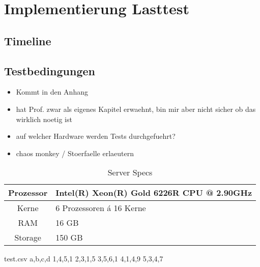 \section{Implementierung Lasttest}
\subsection{Timeline}
\subsection{Testbedingungen}
\begin{itemize}
  \item Kommt in den Anhang
  \item hat Prof. zwar als eigenes Kapitel erwaehnt, bin mir aber nicht sicher ob das wirklich noetig ist
  \item auf welcher Hardware werden Tests durchgefuehrt?
  \item chaos monkey / Stoerfaelle erlaeutern
\end{itemize}

\begin{table}
  \centering
  \caption{Server Specs}
  \bigskip
  \begin{tabular}{ c l }
    \toprule
    Prozessor & Intel(R) Xeon(R) Gold 6226R CPU @ 2.90GHz \\
    \midrule
    Kerne & 6 Prozessoren á 16 Kerne \\
    \midrule
    RAM & 16 GB \\
    \midrule
    Storage & 150 GB \\
    \bottomrule
  \end{tabular}
\end{table}


\begin{filecontents*}{test.csv}
  a,b,c,d
  1,4,5,1
  2,3,1,5
  3,5,6,1
  4,1,4,9
  5,3,4,7
  \end{filecontents*}



   
